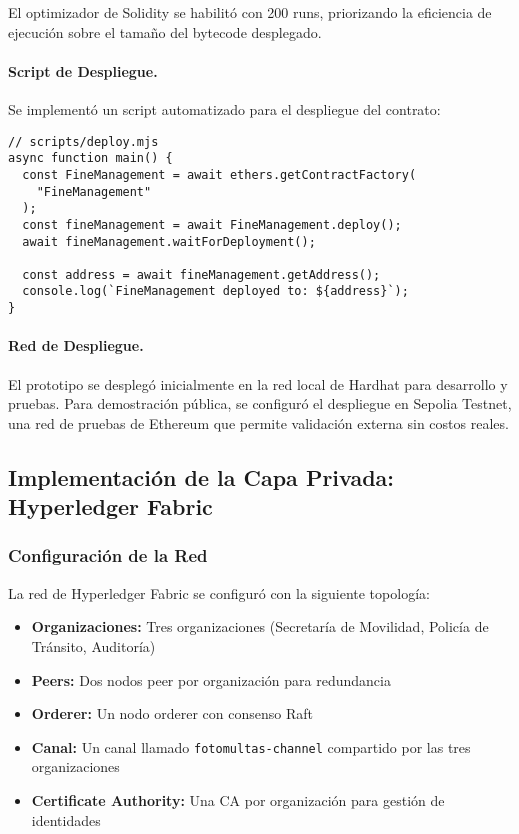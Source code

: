 El optimizador de Solidity se habilitó con 200 runs, priorizando la eficiencia de ejecución sobre el tamaño del bytecode desplegado.

\paragraph{Script de Despliegue.}
Se implementó un script automatizado para el despliegue del contrato:

\begin{verbatim}
// scripts/deploy.mjs
async function main() {
  const FineManagement = await ethers.getContractFactory(
    "FineManagement"
  );
  const fineManagement = await FineManagement.deploy();
  await fineManagement.waitForDeployment();
  
  const address = await fineManagement.getAddress();
  console.log(`FineManagement deployed to: ${address}`);
}
\end{verbatim}

\paragraph{Red de Despliegue.}
El prototipo se desplegó inicialmente en la red local de Hardhat para desarrollo y pruebas. Para demostración pública, se configuró el despliegue en Sepolia Testnet, una red de pruebas de Ethereum que permite validación externa sin costos reales.

\subsection{Implementación de la Capa Privada: Hyperledger Fabric}

\subsubsection{Configuración de la Red}

La red de Hyperledger Fabric se configuró con la siguiente topología:

\begin{itemize}
    \item \textbf{Organizaciones:} Tres organizaciones (Secretaría de Movilidad, Policía de Tránsito, Auditoría)
    \item \textbf{Peers:} Dos nodos peer por organización para redundancia
    \item \textbf{Orderer:} Un nodo orderer con consenso Raft
    \item \textbf{Canal:} Un canal llamado \texttt{fotomultas-channel} compartido por las tres organizaciones
    \item \textbf{Certificate Authority:} Una CA por organización para gestión de identidades
\end{itemize}

